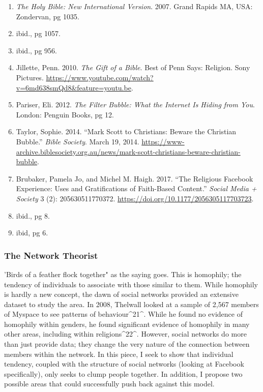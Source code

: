 \documentclass[]{article}
\begin{document}
\begin{enumerate}
\def\labelenumi{\arabic{enumi}.}
\item
  \emph{The Holy Bible: New International Version}. 2007. Grand Rapids
  MA, USA: Zondervan, pg 1035.
\item
  ibid., pg 1057.
\item
  ibid., pg 956.
\item
  Jillette, Penn. 2010. \emph{The Gift of a Bible}. Best of Penn Says:
  Religion. Sony Pictures.
  \url{https://www.youtube.com/watch?v=6md638smQd8\&feature=youtu.be}.
\item
  Pariser, Eli. 2012. \emph{The Filter Bubble: What the Internet Is
  Hiding from You}. London: Penguin Books, pg 12.
\item
  Taylor, Sophie. 2014. ``Mark Scott to Christians: Beware the Christian
  Bubble.'' \emph{Bible Society}. March 19, 2014.
  \url{https://www-archive.biblesociety.org.au/news/mark-scott-christians-beware-christian-bubble}.
\item
  Brubaker, Pamela Jo, and Michel M. Haigh. 2017. ``The Religious
  Facebook Experience: Uses and Gratifications of Faith-Based Content.''
  \emph{Social Media + Society} 3 (2): 205630511770372.
  \url{https://doi.org/10.1177/2056305117703723}.
\item
  ibid., pg 8.
\item
  ibid, pg 6.
\end{enumerate}

\hypertarget{header-n174}{%
\subsubsection{The Network Theorist}\label{header-n174}}

'Birds of a feather flock together" as the saying goes. This is
homophily; the tendency of individuals to associate with those similar
to them. While homophily is hardly a new concept, the dawn of social
networks provided an extensive dataset to study the area. In 2008,
Thelwall looked at a sample of 2,567 members of Myspace to see patterns
of behaviour\^{}21\^{}. While he found no evidence of homophily within
genders, he found significant evidence of homophily in many other areas,
including within religions\^{}22\^{}. However, social networks do more
than just provide data; they change the very nature of the connection
between members within the network. In this piece, I seek to show that
individual tendency, coupled with the structure of social networks
(looking at Facebook specifically), only seeks to clump people together.
In addition, I propose two possible areas that could successfully push
back against this model.
\end{document}
